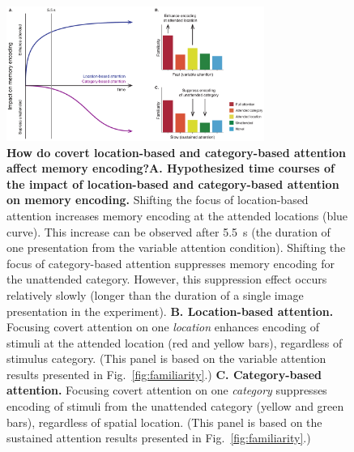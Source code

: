 \documentclass[english]{article}
\begin{document}
\begin{figure}[tp]
  \centering \includegraphics[width=0.75\textwidth]{figs/discussion_schematic}

  \caption{\textbf{How do covert location-based and category-based attention
  affect memory encoding?}\textbf{A. Hypothesized time courses of the impact of
  location-based and category-based attention on memory encoding.} Shifting the
  focus of location-based attention increases memory encoding at the attended
  locations (blue curve). This increase can be observed after 5.5~s (the
  duration of one presentation from the variable attention condition). Shifting
  the focus of category-based attention suppresses memory encoding for the
  unattended category. However, this suppression effect occurs relatively
  slowly (longer than the duration of a single image presentation in the
  experiment). \textbf{B. Location-based attention.} Focusing covert attention
  on one \textit{location} enhances encoding of stimuli at the attended
  location (red and yellow bars), regardless of stimulus category. (This panel
  is based on the variable attention results presented in
  Fig.~\ref{fig:familiarity}.) \textbf{C. Category-based attention.} Focusing
  covert attention on one \textit{category} suppresses encoding of stimuli from
  the unattended category (yellow and green bars), regardless of spatial
  location. (This panel is based on the sustained attention results presented
  in Fig.~\ref{fig:familiarity}.)}

\label{fig:discussion}
\end{figure}
\end{document}
